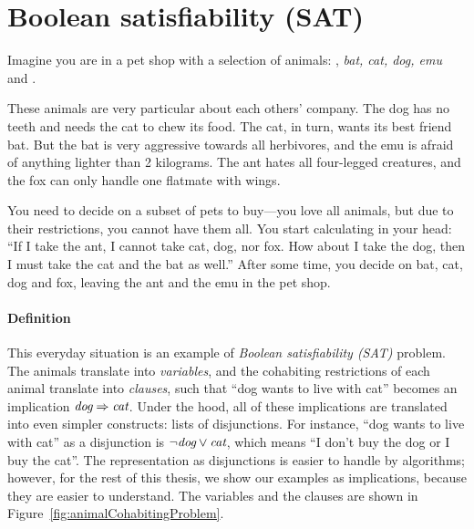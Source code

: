 \def\ant{\text{\em ant}}
\def\bat{\text{\em bat}}
\def\cat{\text{\em cat}}
\def\dog{\text{\em dog}}
\def\emu{\text{\em emu}}
\def\fox{\text{\em fox}}


\section{Boolean satisfiability (SAT)}
\label{sec:SAT-intro}

Imagine you are in a pet shop with a selection of animals: \ant, {\em bat, cat, dog, emu} and \fox.

These animals are very particular about each others' company. The dog has no teeth and needs the cat to chew its food. The cat, in turn, wants its best friend bat. 
But the bat is very aggressive towards all herbivores, and the emu is afraid of anything lighter than 2 kilograms. The ant hates all four-legged creatures, and the fox can only handle one flatmate with wings. 

You need to decide on a subset of pets to buy---you love all animals, but due to their restrictions, you cannot have them all. You start calculating in your head: ``If I take the ant, I cannot take cat, dog, nor fox. How about I take the dog, then I must take the cat and the bat as well.''
After some time, you decide on bat, cat, dog and fox, leaving the ant and the emu in the pet shop.

\paragraph{Definition}

This everyday situation is an example of \emph{Boolean satisfiability (SAT)} problem.
The animals translate into \emph{variables}, %
and the cohabiting restrictions of each animal translate into \emph{clauses},
such that ``dog wants to live with cat'' becomes an implication $\dog \Rightarrow \cat$.
Under the hood, all of these implications are translated into even simpler constructs: lists of disjunctions.
For instance, ``dog wants to live with cat'' as a disjunction is %
$\neg\dog \vee \cat{}$, which means ``I don't buy the dog or I buy the cat''.
The representation as disjunctions is easier to handle by algorithms; however,
for the rest of this thesis, we show our examples as implications, because they are
easier to understand.
The variables and the clauses are shown in Figure~\ref{fig:animalCohabitingProblem}.


